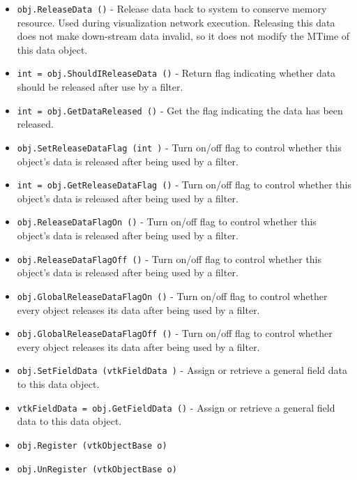 \begin{itemize}
\item  \verb|obj.ReleaseData ()| -  Release data back to system to conserve memory resource. Used during
 visualization network execution.  Releasing this data does not make 
 down-stream data invalid, so it does not modify the MTime of this 
 data object.

\item  \verb|int = obj.ShouldIReleaseData ()| -  Return flag indicating whether data should be released after use  
 by a filter.

\item  \verb|int = obj.GetDataReleased ()| -  Get the flag indicating the data has been released.

\item  \verb|obj.SetReleaseDataFlag (int )| -  Turn on/off flag to control whether this object's data is released
 after being used by a filter.

\item  \verb|int = obj.GetReleaseDataFlag ()| -  Turn on/off flag to control whether this object's data is released
 after being used by a filter.

\item  \verb|obj.ReleaseDataFlagOn ()| -  Turn on/off flag to control whether this object's data is released
 after being used by a filter.

\item  \verb|obj.ReleaseDataFlagOff ()| -  Turn on/off flag to control whether this object's data is released
 after being used by a filter.

\item  \verb|obj.GlobalReleaseDataFlagOn ()| -  Turn on/off flag to control whether every object releases its data
 after being used by a filter.

\item  \verb|obj.GlobalReleaseDataFlagOff ()| -  Turn on/off flag to control whether every object releases its data
 after being used by a filter.

\item  \verb|obj.SetFieldData (vtkFieldData )| -  Assign or retrieve a general field data to this data object.

\item  \verb|vtkFieldData = obj.GetFieldData ()| -  Assign or retrieve a general field data to this data object.

\item  \verb|obj.Register (vtkObjectBase o)|

\item  \verb|obj.UnRegister (vtkObjectBase o)|


\end{itemize}

